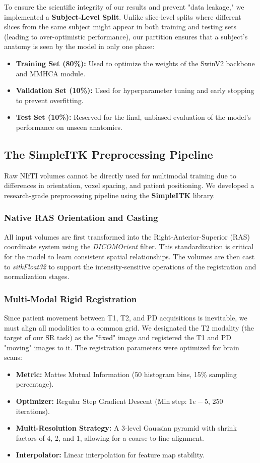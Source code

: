 \documentclass{IEEEoj}
\begin{document}
To ensure the scientific integrity of our results and prevent "data leakage," we implemented a \textbf{Subject-Level Split}. Unlike slice-level splits where different slices from the same subject might appear in both training and testing sets (leading to over-optimistic performance), our partition ensures that a subject's anatomy is seen by the model in only one phase:
\begin{itemize}
    \item \textbf{Training Set (80\%):} Used to optimize the weights of the SwinV2 backbone and MMHCA module.
    \item \textbf{Validation Set (10\%):} Used for hyperparameter tuning and early stopping to prevent overfitting.
    \item \textbf{Test Set (10\%):} Reserved for the final, unbiased evaluation of the model's performance on unseen anatomies.
\end{itemize}

\subsection{The SimpleITK Preprocessing Pipeline}
Raw NIfTI volumes cannot be directly used for multimodal training due to differences in orientation, voxel spacing, and patient positioning. We developed a research-grade preprocessing pipeline using the \textbf{SimpleITK} library.

\subsubsection{Native RAS Orientation and Casting}
All input volumes are first transformed into the Right-Anterior-Superior (RAS) coordinate system using the \textit{DICOMOrient} filter. This standardization is critical for the model to learn consistent spatial relationships. The volumes are then cast to \textit{sitkFloat32} to support the intensity-sensitive operations of the registration and normalization stages.

\subsubsection{Multi-Modal Rigid Registration}
Since patient movement between T1, T2, and PD acquisitions is inevitable, we must align all modalities to a common grid. We designated the T2 modality (the target of our SR task) as the "fixed" image and registered the T1 and PD "moving" images to it.
The registration parameters were optimized for brain scans:
\begin{itemize}
    \item \textbf{Metric:} Mattes Mutual Information (50 histogram bins, 15\% sampling percentage).
    \item \textbf{Optimizer:} Regular Step Gradient Descent (Min step: $1e-5$, 250 iterations).
    \item \textbf{Multi-Resolution Strategy:} A 3-level Gaussian pyramid with shrink factors of 4, 2, and 1, allowing for a coarse-to-fine alignment.
    \item \textbf{Interpolator:} Linear interpolation for feature map stability.
\end{itemize}
\end{document}
